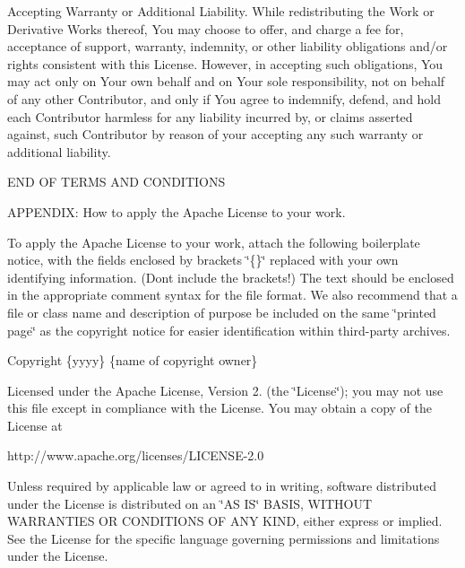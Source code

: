 \begin{DoxyEnumerate}
\item Accepting Warranty or Additional Liability. While redistributing the Work or Derivative Works thereof, You may choose to offer, and charge a fee for, acceptance of support, warranty, indemnity, or other liability obligations and/or rights consistent with this License. However, in accepting such obligations, You may act only on Your own behalf and on Your sole responsibility, not on behalf of any other Contributor, and only if You agree to indemnify, defend, and hold each Contributor harmless for any liability incurred by, or claims asserted against, such Contributor by reason of your accepting any such warranty or additional liability.
\end{DoxyEnumerate}

E\+ND OF T\+E\+R\+MS A\+ND C\+O\+N\+D\+I\+T\+I\+O\+NS

A\+P\+P\+E\+N\+D\+IX\+: How to apply the Apache License to your work.

To apply the Apache License to your work, attach the following boilerplate notice, with the fields enclosed by brackets \char`\"{}\{\}\char`\"{} replaced with your own identifying information. (Don\textquotesingle{}t include the brackets!) The text should be enclosed in the appropriate comment syntax for the file format. We also recommend that a file or class name and description of purpose be included on the same \char`\"{}printed page\char`\"{} as the copyright notice for easier identification within third-\/party archives.

Copyright \{yyyy\} \{name of copyright owner\}

Licensed under the Apache License, Version 2. (the \char`\"{}\+License\char`\"{}); you may not use this file except in compliance with the License. You may obtain a copy of the License at \begin{DoxyVerb}http://www.apache.org/licenses/LICENSE-2.0
\end{DoxyVerb}


Unless required by applicable law or agreed to in writing, software distributed under the License is distributed on an \char`\"{}\+A\+S I\+S\char`\"{} B\+A\+S\+IS, W\+I\+T\+H\+O\+UT W\+A\+R\+R\+A\+N\+T\+I\+ES OR C\+O\+N\+D\+I\+T\+I\+O\+NS OF A\+NY K\+I\+ND, either express or implied. See the License for the specific language governing permissions and limitations under the License. 